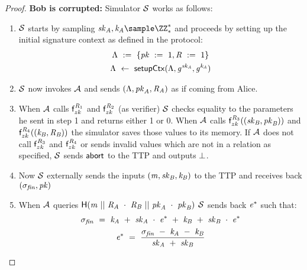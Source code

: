 \begin{proof}
    \textbf{Bob is corrupted: } Simulator $\mathcal{S}$ works as follows:
    \begin{enumerate}
        \item $\mathcal{S}$ starts by sampling $\varSecKeyAlice, \varNonceAlice \sample \cnstIntegersPrimeWithoutZero{*}$ and proceeds by setting up the initial signature context as defined in the protocol:
        \begin{gather*}
            \Lambda ~:=~ \{ \mathit{pk} ~:=~ 1, \mathit{R} ~:=~ 1 \} \\
            \Lambda ~\leftarrow~ \mathsf{setupCtx}( \Lambda, \mathit{g}^{\mathit{sk}_{\mathit{A}}}, \mathit{g}^{\mathit{\mathit{k}_{\mathit{A}}}} ) \\
        \end{gather*}
        \item $\mathcal{S}$ now invokes $\mathcal{A}$ and sends $(\Lambda, \mathit{pk}_{\mathit{A}}, \mathit{R}_{\mathit{A}})$ as if coming from Alice.
        \item When $\mathcal{A}$ calls $\mathsf{f}^{\mathit{R}_1}_{zk}$ and $\mathsf{f}^{\mathit{R}_2}_{zk}$ (as verifier) $\mathcal{S}$ checks equality to the parameters he sent in step 1 and returns either 1 or 0.
        When $\mathcal{A}$ calls $\mathsf{f}^{\mathit{R}_3}_{zk}((\mathit{sk}_{\mathit{B}}, \mathit{pk}_{\mathit{B}}))$ and $\mathsf{f}^{\mathit{R}_4}_{zk}((\mathit{\mathit{k}_{\mathit{B}}}, \mathit{R}_{\mathit{B}}))$ the simulator saves those values to its memory.
        If $\mathcal{A}$ does not call $\mathsf{f}^{\mathit{R}_3}_{zk}$ and $\mathsf{f}^{\mathit{R}_4}_{zk}$ or sends invalid values which are not in a relation as specified, $\mathcal{S}$ sends $\mathsf{abort}$ to the TTP and outputs $\bot$.
        \item Now $\mathcal{S}$ externally sends the inputs $(\mathit{m}, \mathit{sk}_{\mathit{B}}, \mathit{\mathit{k}_{\mathit{B}}})$ to the TTP and receives back $(\sigma_{\mathit{fin}}, \mathit{pk})$
        \item When $\mathcal{A}$ queries $\mathsf{H} (\mathit{m} ~||~ \mathit{R}_{\mathit{A}} ~\cdot~ \mathit{R}_{\mathit{B}} ~||~ \mathit{pk}_{\mathit{A}} ~\cdot~ \mathit{pk}_{\mathit{B}})$ $\mathcal{S}$ sends back $\mathit{e}^*$ such that:
        \begin{gather*}
            \varSigFin \opEqNoQ \varNonceAlice \opAddScalar \varSecKeyAlice \opTimesScalar \funStar{\varSchnorrChallenge} \opAddScalar \varNonceBob \opAddScalar \varSecKeyBob \opTimesScalar \funStar{\varSchnorrChallenge} \\
            \funStar{\varSchnorrChallenge} \opEqNoQ \frac{\varSigFin \opSub \varNonceAlice \opSub \varNonceBob}{\varSecKeyAlice \opAddScalar \varSecKeyBob}

\end{gather*}
\end{enumerate}
\end{proof}
